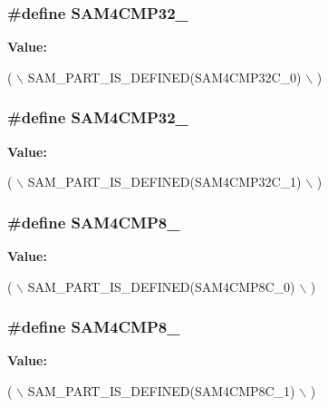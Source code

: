 \subsubsection[{S\+A\+M4\+C\+M\+P32\+\_\+0}]{\setlength{\rightskip}{0pt plus 5cm}\#define S\+A\+M4\+C\+M\+P32\+\_}\label{group__sam__part__macros__group_gaf581d4fe9779afce853dfe577bdeb67b}
{\bfseries Value\+:}
\begin{DoxyCode}
( \(\backslash\)
        SAM\_PART\_IS\_DEFINED(SAM4CMP32C\_0) \(\backslash\)
        )
\end{DoxyCode}
\hypertarget{group__sam__part__macros__group_gadcf0406c9868af4d67e4eeaca0b641ac}{}
\subsubsection[{S\+A\+M4\+C\+M\+P32\+\_\+1}]{\setlength{\rightskip}{0pt plus 5cm}\#define S\+A\+M4\+C\+M\+P32\+\_}\label{group__sam__part__macros__group_gadcf0406c9868af4d67e4eeaca0b641ac}
{\bfseries Value\+:}
\begin{DoxyCode}
( \(\backslash\)
        SAM\_PART\_IS\_DEFINED(SAM4CMP32C\_1) \(\backslash\)
        )
\end{DoxyCode}
\hypertarget{group__sam__part__macros__group_gadaadeb2fb79d513f13503d300ab9c95d}{}
\subsubsection[{S\+A\+M4\+C\+M\+P8\+\_\+0}]{\setlength{\rightskip}{0pt plus 5cm}\#define S\+A\+M4\+C\+M\+P8\+\_}\label{group__sam__part__macros__group_gadaadeb2fb79d513f13503d300ab9c95d}
{\bfseries Value\+:}
\begin{DoxyCode}
( \(\backslash\)
        SAM\_PART\_IS\_DEFINED(SAM4CMP8C\_0) \(\backslash\)
        )
\end{DoxyCode}
\hypertarget{group__sam__part__macros__group_ga7f686a5c46c9cfa8ab0d97ec4f257fb7}{}
\subsubsection[{S\+A\+M4\+C\+M\+P8\+\_\+1}]{\setlength{\rightskip}{0pt plus 5cm}\#define S\+A\+M4\+C\+M\+P8\+\_}\label{group__sam__part__macros__group_ga7f686a5c46c9cfa8ab0d97ec4f257fb7}
{\bfseries Value\+:}
\begin{DoxyCode}
( \(\backslash\)
        SAM\_PART\_IS\_DEFINED(SAM4CMP8C\_1) \(\backslash\)
        )
\end{DoxyCode}
\hypertarget{group__sam__part__macros__group_ga7939b0b91125cd9bd2c327d271599014}{}
